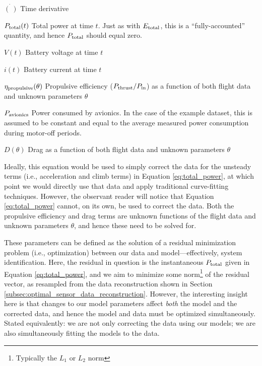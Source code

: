 \begin{eqexpl}
    \item {$\dot{(\:)}$} Time derivative
    \item {$P_{\rm total}(t)$} Total power at time $t$. Just as with $E_{\rm total}$, this is a ``fully-accounted'' quantity, and hence $P_{\rm total}$ should equal zero.
    \item {$V(t)$} Battery voltage at time $t$
    \item {$i(t)$} Battery current at time $t$
    \item {$\eta_{\rm propulsive}(\theta)$} Propulsive efficiency ($P_{\rm thrust} / P_{\rm in}$) as a function of both flight data and unknown parameters $\theta$
    \item {$P_{\rm avionics}$} Power consumed by avionics. In the case of the example dataset, this is assumed to be constant and equal to the average measured power consumption during motor-off periods.
    \item {$D(\theta)$} Drag as a function of both flight data and unknown parameters $\theta$
\end{eqexpl}

Ideally, this equation would be used to simply correct the data for the unsteady terms (i.e., acceleration and climb terms) in Equation \ref{eq:total_power}, at which point we would directly use that data and apply traditional curve-fitting techniques. However, the observant reader will notice that Equation \ref{eq:total_power} cannot, on its own, be used to correct the data. Both the propulsive efficiency and drag terms are unknown functions of the flight data and unknown parameters $\theta$, and hence these need to be solved for.

These parameters can be defined as the solution of a residual minimization problem (i.e., optimization) between our data and model—effectively, system identification. Here, the residual in question is the instantaneous $P_{\rm total}$ given in Equation \ref{eq:total_power}, and we aim to minimize some norm\footnote{Typically the $L_1$ or $L_2$ norm} of the residual vector, as resampled from the data reconstruction shown in Section \ref{subsec:optimal_sensor_data_reconstruction}. However, the interesting insight here is that changes to our model parameters affect \emph{both} the model and the corrected data, and hence the model and data must be optimized simultaneously. Stated equivalently: we are not only correcting the data using our models; we are also simultaneously fitting the models to the data.

